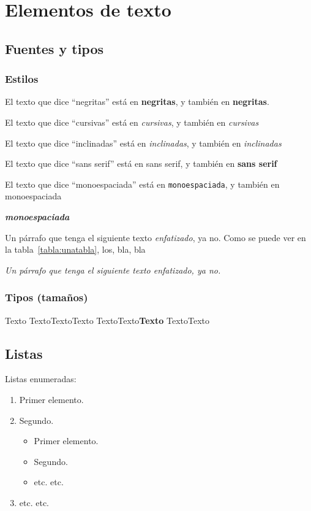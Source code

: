 \chapter{Elementos de texto}
\section{Fuentes y tipos}

\subsection*{Estilos}

 El texto que dice \enquote{negritas} está en \textbf{negritas}, y también en {\bfseries negritas}.
 
 El texto que dice \enquote{cursivas} está en \textit{cursivas}, y también en {\itshape cursivas}
 
 El texto que dice \enquote{inclinadas} está en \textsl{inclinadas}, y también en {\slshape inclinadas}

 El texto que dice \enquote{sans serif} está en \textsf{sans serif}, y también en {\sffamily \textbf{sans serif}}

 El texto que dice \enquote{monoespaciada} está en \texttt{monoespaciada}, y también en {\ttfamily monoespaciada}

 {\ttfamily \textit{\textbf{monoespaciada}}}

Un párrafo que tenga el siguiente texto \emph{enfatizado}, ya no. Como se puede ver en la tabla~\ref{tabla:unatabla}, los, bla, bla

\textit{Un párrafo que tenga el siguiente texto \emph{enfatizado}, ya no.
}

\subsection{Tipos (tamaños)}

{\tiny Texto}
{\footnotesize Texto}{\small Texto}{\normalsize Texto}
{\large Texto}{\Large Texto}{\LARGE\bfseries\sffamily Texto}
{\huge Texto}{\Huge Texto}


\section{Listas}

Listas enumeradas:
\begin{enumerate}
  \item Primer elemento.
  \item Segundo.
  \begin{itemize}
    \item Primer elemento.
    \item Segundo.
    \item etc. etc.
  \end{itemize}  
  \item etc. etc.
\end{enumerate}


\endinput
